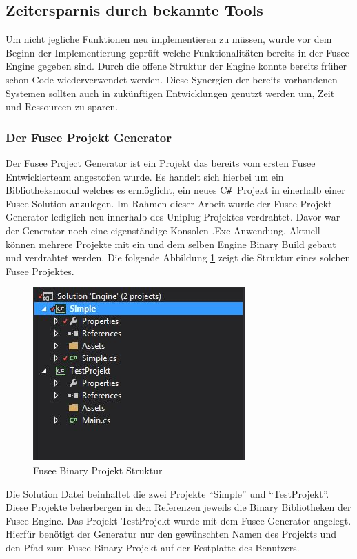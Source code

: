 \documentclass[pagesize, paper=a4, fontsize=12pt, titlepage=true, headings=small, headnosepline, abstractoff, liststotoc, nochapterprefix, plainheadsepline, twoside]{scrreprt}
\newcommand{\CSS}{C\texttt{\# }}
\begin{document}
\subsection{Zeitersparnis durch bekannte Tools}
Um nicht jegliche Funktionen neu implementieren zu müssen, wurde vor dem Beginn der Implementierung geprüft welche Funktionalitäten bereits in der Fusee Engine gegeben sind. Durch die offene Struktur der Engine konnte bereits früher schon Code wiederverwendet werden. Diese Synergien der bereits vorhandenen Systemen sollten auch in zukünftigen Entwicklungen genutzt werden um, Zeit und Ressourcen zu sparen.

\subsubsection{Der Fusee Projekt Generator}
Der Fusee Project Generator ist ein Projekt das bereits vom ersten Fusee Entwicklerteam angestoßen wurde. Es  handelt sich hierbei um ein Bibliotheksmodul welches es ermöglicht, ein neues \CSS Projekt in einerhalb einer Fusee Solution anzulegen. Im Rahmen dieser Arbeit wurde der Fusee Projekt Generator lediglich neu innerhalb des Uniplug Projektes verdrahtet. Davor war der Generator noch eine eigenständige Konsolen .Exe Anwendung. Aktuell können mehrere Projekte mit ein und dem selben Engine Binary Build gebaut und verdrahtet werden. Die folgende Abbildung \ref{FuseeBinaryProjektStruktur} zeigt die Struktur eines solchen Fusee Projektes.
\begin{figure}[ht]
	\centering
	\includegraphics[width=\linewidth/2]{Bilder/FuseeBinaryProjekt.jpg}
	\caption{Fusee Binary Projekt Struktur}
	\label{FuseeBinaryProjektStruktur}
\end{figure}
 Die Solution Datei beinhaltet die zwei Projekte “Simple” und “TestProjekt”. Diese Projekte beherbergen in den Referenzen jeweils die Binary Bibliotheken der Fusee Engine. Das Projekt TestProjekt wurde mit dem Fusee Generator angelegt. Hierfür benötigt der Generatur nur den gewünschten Namen des Projekts und den Pfad zum Fusee Binary Projekt auf der Festplatte des Benutzers.
\end{document}
